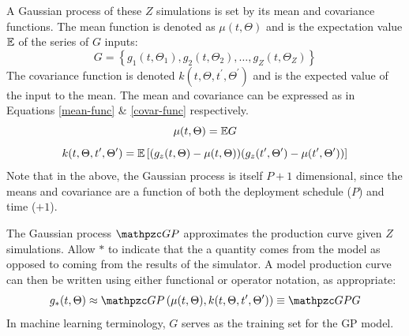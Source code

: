 A Gaussian process of these $Z$ simulations is set by its mean and 
covariance functions. The mean function is denoted as $\mu(t, \Theta)$ and 
is the expectation value $\mathbb{E}$ of 
the series of $G$ inputs:
\begin{equation}
\label{G}
G = \left\{g_1(t, \Theta_1), g_2(t, \Theta_2), \ldots, 
           g_Z(t, \Theta_Z)\right\}
\end{equation}
The covariance function is denoted $k(t, \Theta, t^\prime, \Theta^\prime)$ 
and is the expected value of the input to the mean. The mean and 
covariance can be expressed as
in Equations \ref{mean-func} \& \ref{covar-func} respectively.
\begin{equation}
\label{mean-func}
\mu(t, \Theta) = \mathbb{E} G
\end{equation}
\begin{equation}
\label{covar-func}
k(t, \Theta, t^\prime, \Theta^\prime) = 
    \mathbb{E}\left[(g_z(t, \Theta) - \mu(t, \Theta))
            (g_z(t^\prime, \Theta^\prime) - \mu(t^\prime, \Theta^\prime))
      \right]
\end{equation}
Note that in the above, the Gaussian process is itself $P+1$ dimensional, 
since the means and covariance are a function of both the deployment 
schedule ($P$) and time ($+1$).

The Gaussian process $\GP$ approximates the production curve 
given $Z$ simulations. Allow $*$ to indicate that the a quantity comes from 
the model as opposed to coming from the results of the simulator. A model 
production curve can then be written using either functional or operator
notation, as appropriate:
\begin{equation}
\label{gp-def-approx}
g_*(t, \Theta) \approx \GP\left(\mu(t, \Theta), 
                                 k(t, \Theta, t^\prime, \Theta^\prime)\right) 
                \equiv \GP G
\end{equation}
In machine learning terminology, $G$ serves as the training set for the 
GP model.

